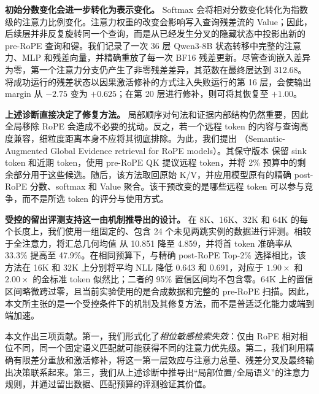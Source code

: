 \textbf{初始分数变化会进一步转化为表示变化。}
Softmax 会将相对分数变化转化为指数级的注意力比例变化。注意力权重的改变会影响写入查询残差流的 Value；因此，后续层并非反复旋转同一个查询，而是从已经发生分叉的隐藏状态中投影出新的 pre-RoPE 查询和键。我们记录了一次 36 层 Qwen3-8B 状态转移中完整的注意力、MLP 和残差向量，并精确重放了每一次 BF16 残差更新。尽管查询嵌入差异为零，第一个注意力分支仍产生了非零残差差异，其范数在最终层达到 312.68。将成功运行的残差状态以因果激活修补的方式注入失败运行的第 16 层，会使输出 margin 从 $-2.75$ 变为 $+0.625$；在第 20 层进行修补，则可将其恢复至 $+1.00$。

\textbf{上述诊断直接决定了修复方法。}
局部顺序对句法和证据内部结构仍然重要，因此全局移除 RoPE 会造成不必要的扰动。反之，若一个远程 token 的内容与查询高度兼容，细粒度距离本身不应将其彻底排除。为此，我们提出 \method（Semantic-Augmented Global Evidence retrieval for RoPE models）。其保守版本 \methodpost 保留 sink token 和近期 token，使用 pre-RoPE QK 提议远程 token，并将 2\% 预算中的剩余部分用于这些候选。随后，该方法取回原始 K/V，并应用模型原有的精确 post-RoPE 分数、softmax 和 Value 聚合。该干预改变的是哪些远程 token 可以参与竞争，而不是所选 token 的评分与使用方式。

\textbf{受控的留出评测支持这一由机制推导出的设计。}
在 8K、16K、32K 和 64K 的每个长度上，我们使用一组固定的、包含 24 个未见两跳实例的数据进行评测。相较于全注意力，\methodpost 将汇总几何均值 \GoldPPL 从 10.851 降至 4.859，并将首 token 准确率从 33.3\% 提高至 47.9\%。在相同预算下，与精确 post-RoPE Top-2\% 选择相比，该方法在 16K 和 32K 上分别将平均 NLL 降低 0.643 和 0.691，对应于 $1.90\times$ 和 $2.00\times$ 的金标准 token 似然比；二者的 95\% 置信区间均不包含零。64K 上的置信区间略微跨过零，且当前实验使用的是合成数据和完整的 pre-RoPE 扫描。因此，本文所主张的是一个受控条件下的机制及其修复方法，而不是普适泛化能力或端到端加速。

本文作出三项贡献。第一，我们形式化了\emph{相位敏感检索失效}：仅由 RoPE 相对相位不同，同一个固定语义匹配就可能获得不同的注意力优先级。第二，我们利用精确有限差分重放和激活修补，将这一第一层效应与注意力总量、残差分叉及最终输出决策联系起来。第三，我们从上述诊断中推导出“局部位置/全局语义”的注意力规则，并通过留出数据、匹配预算的评测验证其价值。
